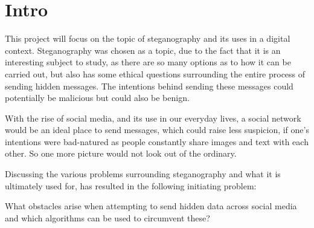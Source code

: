 \section*{Intro}
This project will focus on the topic of steganography and its uses in a digital context. 
Steganography was chosen as a topic, due to the fact that it is an interesting subject to study, as there are so many options as to how it can be carried out, but also has some ethical questions surrounding the entire process of sending hidden messages. 
The intentions behind sending these messages could potentially be malicious but could also be benign.

With the rise of social media, and its use in our everyday lives, a social network would be an ideal place to send messages, which could raise less suspicion, if one's intentions were bad-natured as people constantly share images and text with each other.
So one more picture would not look out of the ordinary.

Discussing the various problems surrounding steganography and what it is ultimately used for, has resulted in the following initiating problem:
\begin{tcolorbox}
What obstacles arise when attempting to send hidden data across social media and which algorithms can be used to circumvent these?
\end{tcolorbox}
